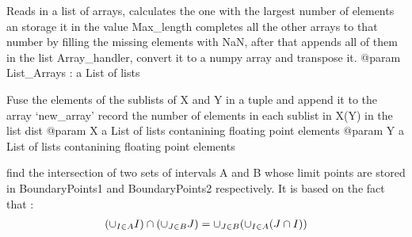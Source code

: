 \documentclass[letterpaper,10pt,english]{sphinxmanual}
\begin{document}
\begin{fulllineitems}
\label{Analisis/Auxiliaryfunctions:Auxiliaryfunctions.ConstructArray}
Reads in a list of arrays, calculates the one with the largest number of elements an storage it in the value Max\_length
completes all the other arrays to that number by filling the missing elements with NaN, after that appends all of them
in the list Array\_handler, convert it to a numpy array and transpose it.
@param List\_Arrays :  a List of lists

\end{fulllineitems}


\begin{fulllineitems}
\label{Analisis/Auxiliaryfunctions:Auxiliaryfunctions.Convert}
Fuse the elements of the sublists of X and Y in a tuple and append it to the array `new\_array'
record the number of elements in each sublist in X(Y) in the list dist
@param X   a List of lists contanining floating point elements
@param Y  a List of lists contanining floating point elements

\end{fulllineitems}


\begin{fulllineitems}
\label{Analisis/Auxiliaryfunctions:Auxiliaryfunctions.F}
\end{fulllineitems}


\begin{fulllineitems}
\label{Analisis/Auxiliaryfunctions:Auxiliaryfunctions.FindIntersection}
find the intersection of two sets of intervals A and B whose limit points are stored in BoundaryPoints1 and BoundaryPoints2 respectively.
It is based on the fact that :
\begin{gather}
\begin{split}(\cup_{I \in A} I) \cap (\cup_{J \in B} J) = \cup_{J \in B} (\cup_{I \in A} (J \cap I))\end{split}\notag
\end{gather}
\end{fulllineitems}
\end{document}
